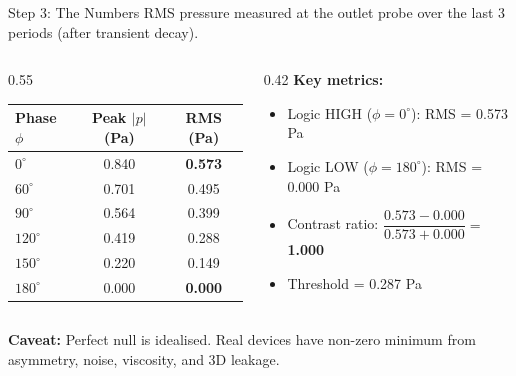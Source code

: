 \documentclass[aspectratio=169,11pt]{beamer}
\begin{document}
\begin{frame}{Step 3: The Numbers}
  RMS pressure measured at the outlet probe over the last 3 periods (after transient decay).

  \vspace{0.15cm}
  \begin{columns}[T]
    \begin{column}{0.55\textwidth}
      \centering
      \footnotesize
      \renewcommand{\arraystretch}{1.05}
      \begin{tabular}{@{}lcc@{}}
        \toprule
        \textbf{Phase $\phi$} & \textbf{Peak $|p|$ (Pa)} & \textbf{RMS (Pa)} \\
        \midrule
        $0^\circ$   & 0.840 & \textbf{0.573} \\
        $60^\circ$  & 0.701 & 0.495 \\
        $90^\circ$  & 0.564 & 0.399 \\
        $120^\circ$ & 0.419 & 0.288 \\
        $150^\circ$ & 0.220 & 0.149 \\
        $180^\circ$ & 0.000 & \textbf{0.000} \\
        \bottomrule
      \end{tabular}
    \end{column}
    \begin{column}{0.42\textwidth}
      \footnotesize
      \textbf{Key metrics:}
      \begin{itemize}
        \item Logic HIGH ($\phi = 0^\circ$): RMS = 0.573 Pa
        \item Logic LOW ($\phi = 180^\circ$): RMS = 0.000 Pa
        \item Contrast ratio: $\dfrac{0.573 - 0.000}{0.573 + 0.000} =$ \textbf{1.000}
        \item Threshold = 0.287 Pa
      \end{itemize}
    \end{column}
  \end{columns}

  \vspace{0.2cm}
  \textcolor{gdpBurgundy}{\small \textbf{Caveat:} Perfect null is idealised. Real devices have non-zero minimum from asymmetry, noise, viscosity, and 3D leakage.}
\end{frame}
\end{document}
